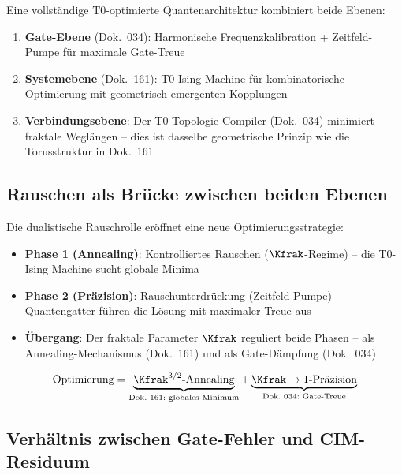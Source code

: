 \begin{keyresult}
    Eine vollständige T0-optimierte Quantenarchitektur kombiniert beide Ebenen:
    \begin{enumerate}
        \item \textbf{Gate-Ebene} (Dok.\ 034): Harmonische Frequenzkalibration +
        Zeitfeld-Pumpe für maximale Gate-Treue
        \item \textbf{Systemebene} (Dok.\ 161): T0-Ising Machine für kombinatorische
        Optimierung mit geometrisch emergenten Kopplungen
        \item \textbf{Verbindungsebene}: Der T0-Topologie-Compiler (Dok.\ 034) minimiert
        fraktale Weglängen -- dies ist dasselbe geometrische Prinzip wie die
        Torusstruktur in Dok.\ 161
    \end{enumerate}
\end{keyresult}

\subsection{Rauschen als Brücke zwischen beiden Ebenen}

Die dualistische Rauschrolle eröffnet eine neue Optimierungsstrategie:

\begin{itemize}
    \item \textbf{Phase 1 (Annealing)}: Kontrolliertes Rauschen ($\Kfrak$-Regime)
    -- die T0-Ising Machine sucht globale Minima
    \item \textbf{Phase 2 (Präzision)}: Rauschunterdrückung (Zeitfeld-Pumpe)
    -- Quantengatter führen die Lösung mit maximaler Treue aus
    \item \textbf{Übergang}: Der fraktale Parameter $\Kfrak$ reguliert beide Phasen --
    als Annealing-Mechanismus (Dok.\ 161) und als Gate-Dämpfung (Dok.\ 034)
\end{itemize}

\begin{equation}
    \text{Optimierung} = \underbrace{\Kfrak^{3/2}\text{-Annealing}}_{\text{Dok.\ 161:\ globales Minimum}}
    + \underbrace{\Kfrak \rightarrow 1\text{-Präzision}}_{\text{Dok.\ 034:\ Gate-Treue}}
    \label{eq:hybrid_optimization}
\end{equation}

\subsection{Verhältnis zwischen Gate-Fehler und CIM-Residuum}

